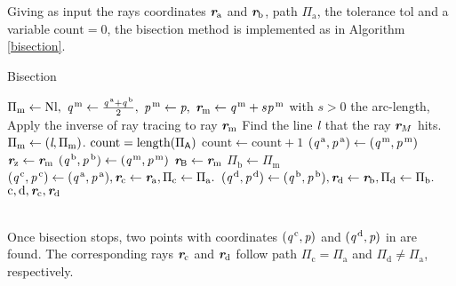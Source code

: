 Giving as input the rays coordinates $\textit{\textbf{r}}_{\textrm{a}}$ and $\textit{\textbf{r}}_{\textrm{b}}$, path $\Pi_\textrm{a}$, the tolerance \textrm{tol} and a variable $\textrm{count} = 0$, the bisection method is implemented as in Algorithm \ref{bisection}.
\begin{algorithm}
\caption{Bisection}\label{bisection}
\begin{algorithmic}[1]
\State $\Pi_{\textrm{m}}\gets \textrm{Nl},$
\State $\textit{q}^{\,\textrm{m}}\gets \frac{\textit{q}^{\,\textrm{a}}+\textit{q}^{\,\textrm{b}}}{2},$ 
\State $\textit{p}^{\,\textrm{m}}\gets\textit{p},$
\State $\textit{\textbf{r}}_{\textrm{m}}\gets \textit{q}^{\,\textrm{m}}+s \textit{p}^{\,\textrm{m}}$ with $s>0$ the arc-length,
\State Apply the inverse of ray tracing to ray $\textit{\textbf{r}}_{\textrm{m}}$
\State Find the line $\textit{l}$ that the ray $\textit{\textbf{r}}_{M}$ hits.
\State $\Pi_{\textrm{m}}\gets (\textit{l},\Pi_{\textrm{m}})$.
$\textrm{count} = \mbox{length}(\Pi_{\textsf{A}})$
\Else \State $\textrm{count}\gets\textrm{count}+1$ 
\EndIf
\EndWhile
{}
\State $(\textit{q}^{\,\textrm{a}}, \textit{p}^{\,\textrm{a}})\gets (\textit{q}^{\,\textrm{m}}, \textit{p}^{\,\textrm{m}})$
\State $\textit{\textbf{r}}_{\textrm{z}}\gets \textit{\textbf{r}}_{\textrm{m}}$
\Else 
\State $(\textit{q}^{\,\textrm{b}}, \textit{p}^{\,\textrm{b}})\gets (\textit{q}^{\,\textrm{m}}, \textit{p}^{\,\textrm{m}})$
\State $\textit{\textbf{r}}_{\textsf{B}}\gets \textit{\textbf{r}}_{\textrm{m}}$
\State $\Pi_\textrm{b}\gets \Pi_{\textrm{m}}$
\EndIf
\EndWhile
\State $(\textit{q}^{\,\textrm{c}}, \textit{p}^{\,\textrm{c}})\gets (\textit{q}^{\,\textrm{a}}, \textit{p}^{\,\textrm{a}}), \textit{\textbf{r}}_{\textrm{c}}\gets \textit{\textbf{r}}_{\textrm{a}}, \Pi_\textrm{c}\gets \Pi_{\textrm{a}}.$
\State $(\textit{q}^{\,\textrm{d}}, \textit{p}^{\,\textrm{d}})\gets (\textit{q}^{\,\textrm{b}}, \textit{p}^{\,\textrm{b}}), \textit{\textbf{r}}_{\textrm{d}}\gets \textit{\textbf{r}}_{\textrm{b}}, \Pi_\textrm{d}\gets \Pi_{\textrm{b}}.$
\State \Return $\textrm{c}, \textrm{d}, \textit{\textbf{r}}_\textrm{c}, \textit{\textbf{r}}_\textrm{d}$
\end{algorithmic}
\end{algorithm}
\\ \indent Once bisection stops, two points with coordinates $(\textit{q}^{\,\textrm{c}}, \textit{p})$ and $(\textit{q}^{\,\textrm{d}}, \textit{p})$ in  are found. The corresponding rays $\textit{\textbf{r}}_{\textrm{c}}$ and $\textit{\textbf{r}}_{\textrm{d}}$ follow path $\Pi_{\textrm{c}}=\Pi_{\textrm{a}}$ and $\Pi_{\textrm{d}}\neq\Pi_{\textrm{a}}$, respectively. 

